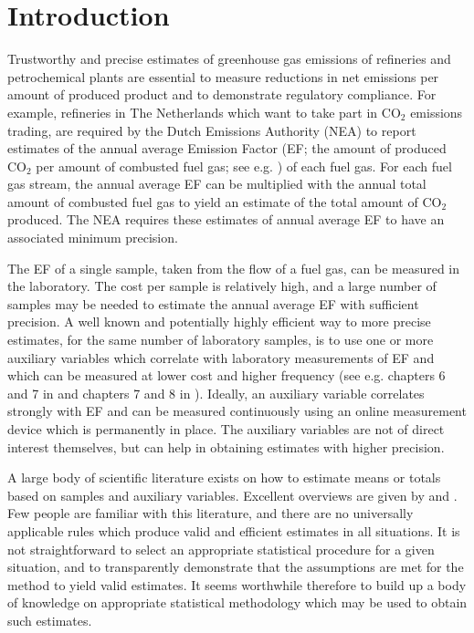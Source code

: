 \clearpage
\section{Introduction}\label{Intro}

Trustworthy and precise estimates of greenhouse gas emissions of refineries and petrochemical plants are essential to measure reductions in net emissions per amount of produced product and to demonstrate regulatory compliance. For example, refineries in The Netherlands which want to take part in $\text{CO}_2$ emissions trading, are required by the Dutch Emissions Authority (NEA) to report estimates of the annual average Emission Factor (EF; the amount of produced $\text{CO}_2$ per amount of combusted fuel gas; see e.g. \cite{API2009}) of each fuel gas. For each fuel gas stream, the annual average EF can be multiplied with the annual total amount of combusted fuel gas to yield an estimate of the total amount of $\text{CO}_2$ produced. The NEA requires these estimates of annual average EF to have an associated minimum precision. 

The EF of a single sample, taken from the flow of a fuel gas, can be measured in the laboratory. The cost per sample is relatively high, and a large number of samples may be needed to estimate the annual average EF with sufficient precision. A well known and potentially highly efficient way to more precise estimates, for the same number of laboratory samples, is to use one or more auxiliary variables which correlate with laboratory measurements of EF and which can be measured at lower cost and higher frequency (see e.g. chapters 6 and 7 in \cite{Cochran77} and chapters 7 and 8 in \cite{Thompson}). Ideally, an auxiliary variable correlates strongly with EF and can be measured continuously using an online measurement device which is permanently in place. The auxiliary variables are not of direct interest themselves, but can help in obtaining estimates with higher precision.

A large body of scientific literature exists on how to estimate means or totals based on samples and auxiliary variables. Excellent overviews are given by \citet{Cochran77} and \citet{Thompson}. Few people are familiar with this literature, and there are no universally applicable rules which produce valid and efficient estimates in all situations. It is not straightforward to select an appropriate statistical procedure for a given situation, and to transparently demonstrate that the assumptions are met for the method to yield valid estimates. It seems worthwhile therefore to build up a body of knowledge on appropriate statistical methodology which may be used to obtain such estimates. 

